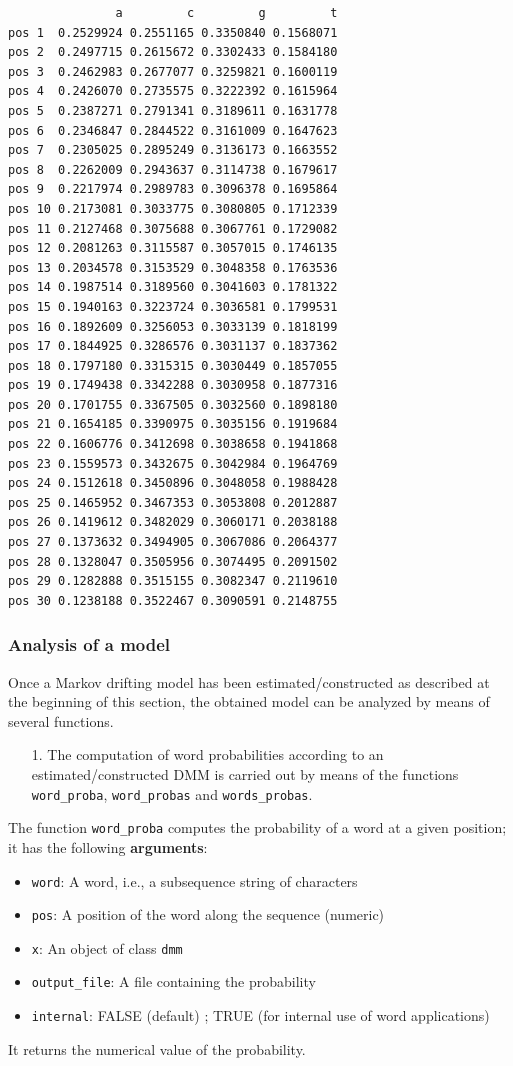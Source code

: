 \documentclass[article,nojss]{jss}\usepackage[]{graphicx}\usepackage[]{color}
\begin{document}
\begin{lstlisting}
               a         c         g         t
pos 1  0.2529924 0.2551165 0.3350840 0.1568071
pos 2  0.2497715 0.2615672 0.3302433 0.1584180
pos 3  0.2462983 0.2677077 0.3259821 0.1600119
pos 4  0.2426070 0.2735575 0.3222392 0.1615964
pos 5  0.2387271 0.2791341 0.3189611 0.1631778
pos 6  0.2346847 0.2844522 0.3161009 0.1647623
pos 7  0.2305025 0.2895249 0.3136173 0.1663552
pos 8  0.2262009 0.2943637 0.3114738 0.1679617
pos 9  0.2217974 0.2989783 0.3096378 0.1695864
pos 10 0.2173081 0.3033775 0.3080805 0.1712339
pos 11 0.2127468 0.3075688 0.3067761 0.1729082
pos 12 0.2081263 0.3115587 0.3057015 0.1746135
pos 13 0.2034578 0.3153529 0.3048358 0.1763536
pos 14 0.1987514 0.3189560 0.3041603 0.1781322
pos 15 0.1940163 0.3223724 0.3036581 0.1799531
pos 16 0.1892609 0.3256053 0.3033139 0.1818199
pos 17 0.1844925 0.3286576 0.3031137 0.1837362
pos 18 0.1797180 0.3315315 0.3030449 0.1857055
pos 19 0.1749438 0.3342288 0.3030958 0.1877316
pos 20 0.1701755 0.3367505 0.3032560 0.1898180
pos 21 0.1654185 0.3390975 0.3035156 0.1919684
pos 22 0.1606776 0.3412698 0.3038658 0.1941868
pos 23 0.1559573 0.3432675 0.3042984 0.1964769
pos 24 0.1512618 0.3450896 0.3048058 0.1988428
pos 25 0.1465952 0.3467353 0.3053808 0.2012887
pos 26 0.1419612 0.3482029 0.3060171 0.2038188
pos 27 0.1373632 0.3494905 0.3067086 0.2064377
pos 28 0.1328047 0.3505956 0.3074495 0.2091502
pos 29 0.1282888 0.3515155 0.3082347 0.2119610
pos 30 0.1238188 0.3522467 0.3090591 0.2148755
\end{lstlisting}

\subsubsection{Analysis of a model} \label{subsection_pack_analysis}

Once a Markov drifting model has been estimated/constructed as described at the beginning of this section, the obtained model can be analyzed by means of several functions. \\


\begin{enumerate}
	\item[1.] The computation of word probabilities according to an estimated/constructed DMM is carried out by means of the functions  \verb|word_proba|, \verb|word_probas| and \verb|words_probas|.
\end{enumerate}
%
The function \verb|word_proba| computes the probability of a word at a given position; it has the following {\bf arguments}:
%
\begin{itemize}
\item {\tt word}: A word, i.e., a subsequence string of characters
\item {\tt pos}: A position of the word along the sequence (numeric)
\item {\tt x}: An object of class {\tt dmm}
\item {\tt output\_file}: A file containing the probability
\item {\tt internal}: FALSE (default) ; TRUE (for internal use of word applications)
\end{itemize}
%
It returns the numerical value of the  probability.\\
\end{document}
